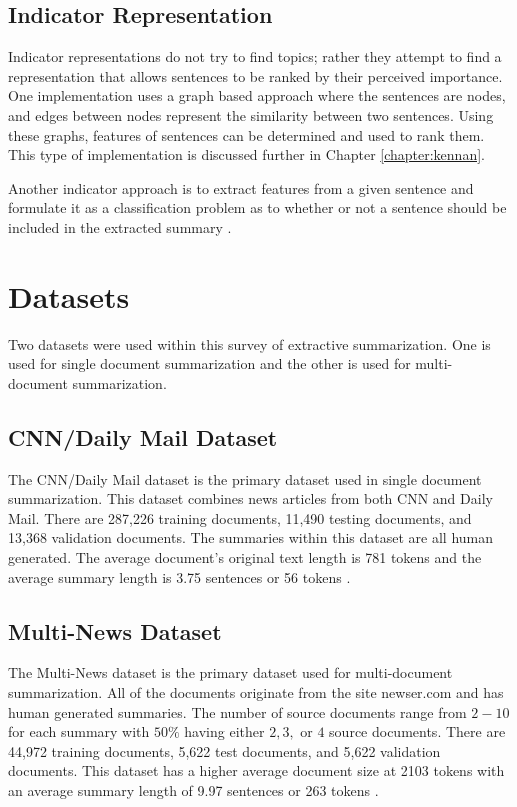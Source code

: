 \documentclass[../writeup.tex]{subfiles}
\begin{document}
\subsection{Indicator Representation}\label{intro:sec:indicator-representation}

Indicator representations do not try to find topics; rather they attempt to find a representation that allows sentences to be ranked by their perceived importance.
One implementation uses a graph based approach where the sentences are nodes, and edges between nodes represent the similarity between two sentences.
Using these graphs, features of sentences can be determined and used to rank them.
This type of implementation is discussed further in Chapter \ref{chapter:kennan}.

Another indicator approach is to extract features from a given sentence and formulate it as a classification problem as to whether or not a sentence should be included in the extracted summary \autocite*{text-summarization-techniques}.

\section{Datasets}\label{intro:sec:datasets}

Two datasets were used within this survey of extractive summarization. One is used for single document summarization and the other is used for multi-document summarization.

\subsection{CNN/Daily Mail Dataset}\label{intro:sec:datasets:cnn-dailymail}

The CNN/Daily Mail dataset is the primary dataset used in single document summarization. This dataset combines news articles from both CNN and Daily Mail. There are 287,226 training documents, 11,490 testing documents, and 13,368 validation documents. The summaries within this dataset are all human generated. The average document's original text length is 781 tokens and the average summary length is 3.75 sentences or 56 tokens \autocite{dataset-cnn}.

\subsection{Multi-News Dataset}\label{intro:sec:datasets:multi-news}

The Multi-News dataset is the primary dataset used for multi-document summarization. All of the documents originate from the site newser.com and has human generated summaries. The number of source documents range from $2 - 10$ for each summary with $50\%$ having either $2,3, \text{ or } 4$ source documents. There are 44,972 training documents, 5,622 test documents, and 5,622 validation documents. This dataset has a higher average document size at 2103 tokens with an average summary length of 9.97 sentences or 263 tokens \autocite{dataset-multinews}.
\end{document}
